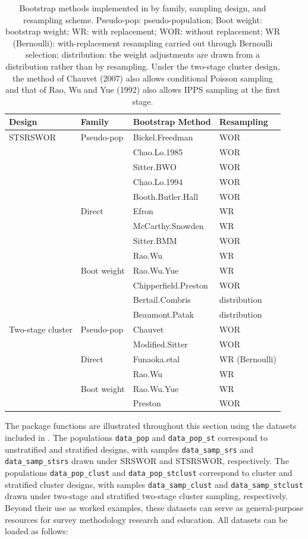 \begin{table}

\caption{\label{tab:tab-methods}Bootstrap methods implemented in  by family, sampling design, and resampling scheme. Pseudo-pop: pseudo-population; Boot weight: bootstrap weight; WR: with replacement; WOR: without replacement; WR (Bernoulli): with-replacement resampling carried out through Bernoulli selection; distribution: the weight adjustments are drawn from a distribution rather than by resampling. Under the two-stage cluster design, the method of Chauvet (2007) also allows conditional Poisson sampling and that of Rao, Wu and Yue (1992) also allows IPPS sampling at the first stage.}
\centering
\begin{tabular}[t]{llll}
\toprule
Design & Family & Bootstrap Method & Resampling\\
\midrule
STSRSWOR & Pseudo-pop & Bickel.Freedman & WOR\\
 &  & Chao.Lo.1985 & WOR\\
 &  & Sitter.BWO & WOR\\
 &  & Chao.Lo.1994 & WOR\\
 &  & Booth.Butler.Hall & WOR\\
\addlinespace
 & Direct & Efron & WR\\
 &  & McCarthy.Snowden & WR\\
 &  & Sitter.BMM & WOR\\
 &  & Rao.Wu & WR\\
\addlinespace
 & Boot weight & Rao.Wu.Yue & WR\\
 &  & Chipperfield.Preston & WOR\\
 &  & Bertail.Combris & distribution\\
 &  & Beaumont.Patak & distribution\\
\addlinespace
Two-stage cluster & Pseudo-pop & Chauvet & WOR\\
 &  & Modified.Sitter & WOR\\
\addlinespace
 & Direct & Funaoka.etal & WR (Bernoulli)\\
 &  & Rao.Wu & WR\\
\addlinespace
 & Boot weight & Rao.Wu.Yue & WR\\
 &  & Preston & WOR\\
\bottomrule
\end{tabular}
\end{table}

The package functions are illustrated throughout this section using the datasets included in . The populations \texttt{data\_pop} and \texttt{data\_pop\_st} correspond to unstratified and stratified designs, with samples \texttt{data\_samp\_srs} and \texttt{data\_samp\_stsrs} drawn under SRSWOR and STSRSWOR, respectively. The populations \texttt{data\_pop\_clust} and \texttt{data\_pop\_stclust} correspond to cluster and stratified cluster designs, with samples \texttt{data\_samp\_clust} and \texttt{data\_samp\_stclust} drawn under two-stage and stratified two-stage cluster sampling, respectively. Beyond their use as worked examples, these datasets can serve as general-purpose resources for survey methodology research and education. All datasets can be loaded as follows:

